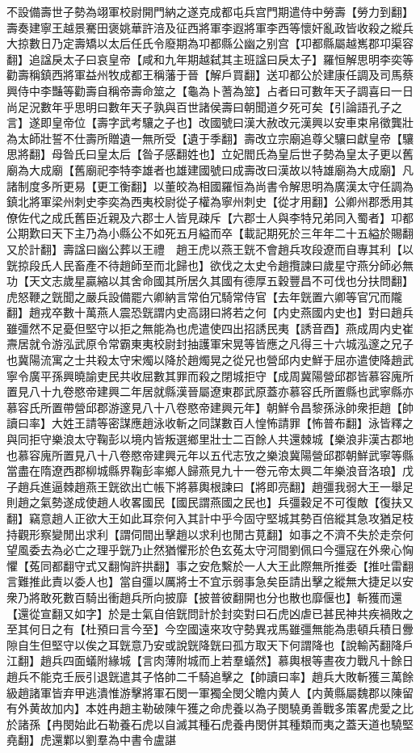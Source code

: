 不設備壽世子勢為翊軍校尉開門納之遂克成都屯兵宫門期遣侍中勞壽【勞力到翻】壽奏建寧王越景騫田褒姚華許涪及征西將軍李遐將軍李西等懷奸亂政皆收殺之縱兵大掠數日乃定壽矯以太后任氏令廢期為卭都縣公幽之别宫【卭都縣屬越嶲郡卭渠容翻】追諡戾太子曰哀皇帝【咸和九年期越弑其主班諡曰戾太子】羅恒解思明李奕等勸壽稱鎮西將軍益州牧成都王稱藩于晉【解戶買翻】送卭都公於建康任調及司馬蔡興侍中李豔等勸壽自稱帝壽命筮之【龜為卜蓍為筮】占者曰可數年天子調喜曰一日尚足況數年乎思明曰數年天子孰與百世諸侯壽曰朝聞道夕死可矣【引論語孔子之言】遂即皇帝位【壽字武考驤之子也】改國號曰漢大赦改元漢興以安車束帛徵龔壯為太師壯誓不仕壽所贈遺一無所受【遺于季翻】壽改立宗廟追尊父驤曰獻皇帝【驤思將翻】母昝氏曰皇太后【昝子感翻姓也】立妃閻氏為皇后世子勢為皇太子更以舊廟為大成廟【舊廟祀李特李雄者也雄建國號曰成壽改曰漢故以特雄廟為大成廟】凡諸制度多所更易【更工衡翻】以董皎為相國羅恒為尚書令解思明為廣漢太守任調為鎮北將軍梁州刺史李奕為西夷校尉從子權為寧州刺史【從才用翻】公卿州郡悉用其僚佐代之成氏舊臣近親及六郡士人皆見疎斥【六郡士人與李特兄弟同入蜀者】卭都公期歎曰天下主乃為小縣公不如死五月縊而卒【載記期死於三年年二十五縊於賜翻又於計翻】壽諡曰幽公葬以王禮　趙王虎以燕王皝不會趙兵攻段遼而自專其利【以皝掠段氏人民畜產不待趙師至而北歸也】欲伐之太史令趙攬諫曰歲星守燕分師必無功【天文志歲星贏縮以其舍命國其所居久其國有德厚五穀豐昌不可伐也分扶問翻】虎怒鞭之皝聞之嚴兵設備罷六卿納言常伯冗騎常侍官【去年皝置六卿等官冗而隴翻】趙戎卒數十萬燕人震恐皝謂内史高詡曰將若之何【内史燕國内史也】對曰趙兵雖彊然不足憂但堅守以拒之無能為也虎遣使四出招誘民夷【誘音酉】燕成周内史崔燾居就令游泓武原令常霸東夷校尉封抽護軍宋晃等皆應之凡得三十六城泓邃之兄子也冀陽流寓之士共殺太守宋燭以降於趙燭晃之從兄也營邱内史鮮于屈亦遣使降趙武寧令廣平孫興曉諭吏民共收屈數其罪而殺之閉城拒守【成周冀陽營邱郡皆慕容廆所置見八十九卷愍帝建興二年居就縣漢晉屬遼東郡武原蓋亦慕容氏所置縣也武寧縣亦慕容氏所置帶營邱郡游邃見八十八卷愍帝建興元年】朝鮮令昌黎孫泳帥衆拒趙【帥讀曰率】大姓王請等密謀應趙泳收斬之同謀數百人惶怖請罪【怖普布翻】泳皆釋之與同拒守樂浪太守鞠彭以境内皆叛選鄉里壯士二百餘人共還棘城【樂浪非漢古郡地也慕容廆所置見八十八卷愍帝建興元年以五代志攷之樂浪冀陽營邱郡朝鮮武寧等縣當盡在隋遼西郡柳城縣界鞠彭率鄉人歸燕見九十一卷元帝太興二年樂浪音洛琅】戊子趙兵進逼棘趙燕王皝欲出亡帳下將慕輿根諫曰【將即亮翻】趙彊我弱大王一舉足則趙之氣勢遂成使趙人收畧國民【國民謂燕國之民也】兵彊穀足不可復敵【復扶又翻】竊意趙人正欲大王如此耳奈何入其計中乎今固守堅城其勢百倍縱其急攻猶足枝持觀形察變閒出求利【謂伺間出擊趙以求利也閒古莧翻】如事之不濟不失於走奈何望風委去為必亡之理乎皝乃止然猶懼形於色玄菟太守河間劉佩曰今彊寇在外衆心恟懼【菟同都翻守式又翻恟許拱翻】事之安危繫於一人大王此際無所推委【推吐雷翻言難推此責以委人也】當自彊以厲將士不宜示弱事急矣臣請出擊之縱無大捷足以安衆乃將敢死數百騎出衝趙兵所向披靡【披普彼翻開也分也散也靡偃也】斬獲而還【還從宣翻又如字】於是士氣自倍皝問計於封奕對曰石虎凶虐已甚民神共疾禍敗之至其何日之有【杜預曰言今至】今空國遠來攻守勢異戎馬雖彊無能為患頓兵積日釁隙自生但堅守以俟之耳皝意乃安或說皝降皝曰孤方取天下何謂降也【說輸芮翻降戶江翻】趙兵四面蟻附緣城【言肉薄附城而上若羣蟻然】慕輿根等晝夜力戰凡十餘日趙兵不能克壬辰引退皝遣其子恪帥二千騎追擊之【帥讀曰率】趙兵大敗斬獲三萬餘級趙諸軍皆弃甲逃潰惟游擊將軍石閔一軍獨全閔父瞻内黄人【内黄縣屬魏郡以陳留有外黄故加内】本姓冉趙主勒破陳午獲之命虎養以為子閔驍勇善戰多策畧虎愛之比於諸孫【冉閔始此石勒養石虎以自滅其種石虎養冉閔併其種類而夷之蓋天道也驍堅堯翻】虎還鄴以劉羣為中書令盧諶